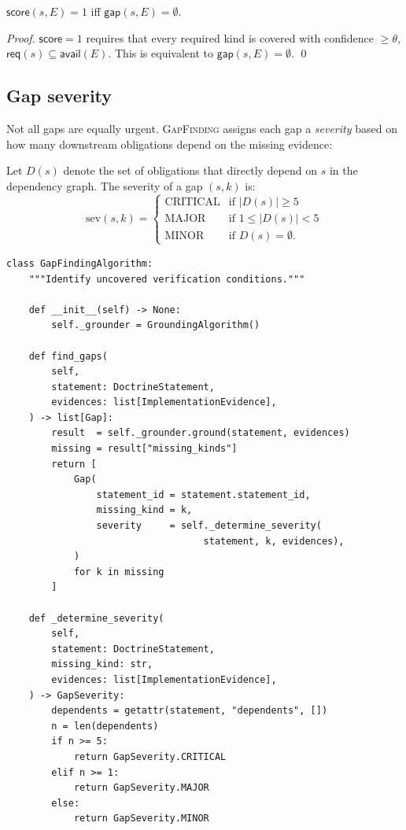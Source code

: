\documentclass[11pt]{article}
\newcommand{\GapAlg}{\textsc{GapFinding}}    %
\newcommand{\Score}{\mathsf{score}}          %
\newcommand{\Avail}{\mathsf{avail}}          %
\newcommand{\Req}{\mathsf{req}}              %
\newcommand{\Gap}{\mathsf{gap}}              %
\begin{document}
\begin{proposition}\label{prop:coverage-duality}
$\Score(s, E) = 1$ iff $\Gap(s, E) = \emptyset$.
\end{proposition}
\begin{proof}
$\Score = 1$ requires that every required kind is covered with
confidence $\geq \theta$, \ie $\Req(s) \subseteq \Avail(E)$.
This is equivalent to $\Gap(s, E) = \emptyset$.
\qed
\end{proof}

\subsection{Gap severity}

Not all gaps are equally urgent.
\GapAlg{} assigns each gap a \emph{severity} based on how many
downstream obligations depend on the missing evidence:

\begin{definition}\label{def:gap-severity}
Let $D(s)$ denote the set of obligations that directly depend on
$s$ in the dependency graph.
The severity of a gap $(s, k)$ is:
\[
  \mathrm{sev}(s, k) =
  \begin{cases}
    \mathrm{CRITICAL} & \text{if } |D(s)| \geq 5 \\
    \mathrm{MAJOR}    & \text{if } 1 \leq |D(s)| < 5 \\
    \mathrm{MINOR}    & \text{if } D(s) = \emptyset.
  \end{cases}
\]
\end{definition}

\begin{lstlisting}[style=jugeo-python,
  caption={\GapAlg{} class from
  \texttt{doctrine\_completion/algorithms.py}.},
  label={lst:gap}]
class GapFindingAlgorithm:
    """Identify uncovered verification conditions."""

    def __init__(self) -> None:
        self._grounder = GroundingAlgorithm()

    def find_gaps(
        self,
        statement: DoctrineStatement,
        evidences: list[ImplementationEvidence],
    ) -> list[Gap]:
        result  = self._grounder.ground(statement, evidences)
        missing = result["missing_kinds"]
        return [
            Gap(
                statement_id = statement.statement_id,
                missing_kind = k,
                severity     = self._determine_severity(
                                   statement, k, evidences),
            )
            for k in missing
        ]

    def _determine_severity(
        self,
        statement: DoctrineStatement,
        missing_kind: str,
        evidences: list[ImplementationEvidence],
    ) -> GapSeverity:
        dependents = getattr(statement, "dependents", [])
        n = len(dependents)
        if n >= 5:
            return GapSeverity.CRITICAL
        elif n >= 1:
            return GapSeverity.MAJOR
        else:
            return GapSeverity.MINOR
\end{lstlisting}
\end{document}
